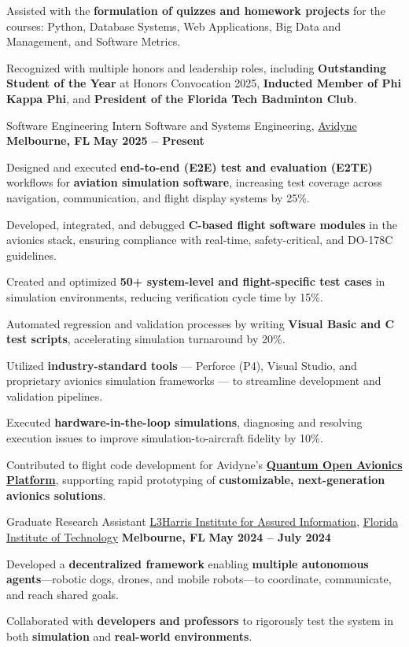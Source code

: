 \begin{cventries}
{\begin{cvitems}
\item Assisted with the \textbf{formulation of quizzes and homework projects} for the courses: Python, Database Systems, Web Applications, Big Data and Management, and Software Metrics.
\item Recognized with multiple honors and leadership roles, including \textbf{Outstanding Student of the Year} at Honors Convocation 2025, \textbf{Inducted Member of Phi Kappa Phi}, and \textbf{President of the Florida Tech Badminton Club}.
\end{cvitems}
}
\cventry
{Software Engineering Intern}
{Software and Systems Engineering, \href{https://www.avidyne.com/}{Avidyne}}
{\textbf{Melbourne, FL}}
{\textbf{May 2025 – Present}}
{
\begin{cvitems}
  \item Designed and executed \textbf{end-to-end (E2E) test and evaluation (E2TE)} workflows for \textbf{aviation simulation software}, increasing test coverage across navigation, communication, and flight display systems by 25\%.
  \item Developed, integrated, and debugged \textbf{C-based flight software modules} in the avionics stack, ensuring compliance with real-time, safety-critical, and DO-178C guidelines.
  \item Created and optimized \textbf{50+ system-level and flight-specific test cases} in simulation environments, reducing verification cycle time by 15\%.
  \item Automated regression and validation processes by writing \textbf{Visual Basic and C test scripts}, accelerating simulation turnaround by 20\%.
  \item Utilized \textbf{industry-standard tools} — Perforce (P4), Visual Studio, and proprietary avionics simulation frameworks — to streamline development and validation pipelines.
  \item Executed \textbf{hardware-in-the-loop simulations}, diagnosing and resolving execution issues to improve simulation-to-aircraft fidelity by 10\%.
  \item Contributed to flight code development for Avidyne’s \href{https://quantum.avidyne.com/}{\textbf{Quantum Open Avionics Platform}}, supporting rapid prototyping of \textbf{customizable, next-generation avionics solutions}.
\end{cvitems}
}
\cventry
{Graduate Research Assistant}
{\href{https://research.fit.edu/l3hiai/}{L3Harris Institute for Assured Information}, \href{www.fit.edu}{Florida Institute of Technology}}
{\textbf{Melbourne, FL}}
{\textbf{May 2024 – July 2024}}
{
\begin{cvitems}
\item Developed a \textbf{decentralized framework} enabling \textbf{multiple autonomous agents}—robotic dogs, drones, and mobile robots—to coordinate, communicate, and reach shared goals.
\item Collaborated with \textbf{developers and professors} to rigorously test the system in both \textbf{simulation} and \textbf{real-world environments}.
\end{cvitems}
}


\end{cventries}
